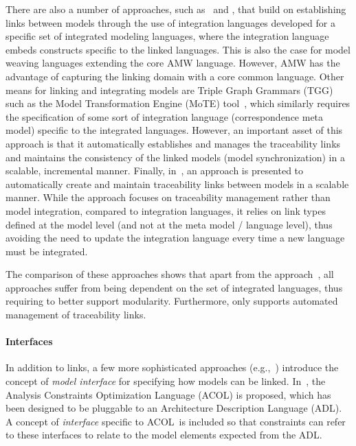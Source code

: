 There are also a number of approaches, such as~\cite{SimkoASME2012} and \cite{BoddyAVICPS2011}, that build on establishing links between models through the use of integration languages developed for a specific set of integrated modeling languages, where the integration language embeds constructs specific to the linked languages. This is also the case for model weaving languages extending the core AMW language. However, AMW has the advantage of capturing the linking domain with a core common language.
%
%
Other means for linking and integrating models are Triple Graph Grammars (TGG) such as the Model Transformation Engine (MoTE) tool~\cite{mote-website}, which  similarly requires the specification of some sort of integration language (correspondence meta model) specific to the integrated languages. However, an important asset of this approach is that it automatically establishes and manages the traceability links and maintains the consistency of the linked models (model synchronization) in a scalable, incremental manner.
%
%
Finally, in~\cite{SNG10,SHG12}\cite{Beyhl_et_al:2013}, an approach is presented to automatically create and maintain traceability links between models in a scalable manner. While the approach focuses on traceability management rather than model integration, compared to integration languages, it relies on link types defined at the model level (and not at the meta model / language level), thus avoiding the need to update the integration language every time a new language must be integrated.                  
%
%

The comparison of these approaches shows that apart from the  approach~\cite{SNG10,SHG12}\cite{Beyhl_et_al:2013}, all approaches suffer from being dependent on the set of integrated languages, thus requiring to better support modularity.       Furthermore, only \cite{mote-website}\cite{SNG10,SHG12}\cite{Beyhl_et_al:2013} supports automated management of traceability links.

\paragraph{Interfaces}
%
In addition to links, a few more sophisticated approaches  (e.g.,~\cite{LangsweirdtISORC2010, HesselundMODELS2008, JurackICGT2010}) introduce the concept of \emph{model interface} for specifying how models can be linked. In~\cite{LangsweirdtISORC2010}, the Analysis Constraints Optimization Language (ACOL) is proposed, which has been designed to be pluggable to an Architecture Description Language (ADL). A concept of \emph{interface} specific to ACOL\ is included so that constraints can refer to these interfaces to relate to the model elements expected from the ADL. 

